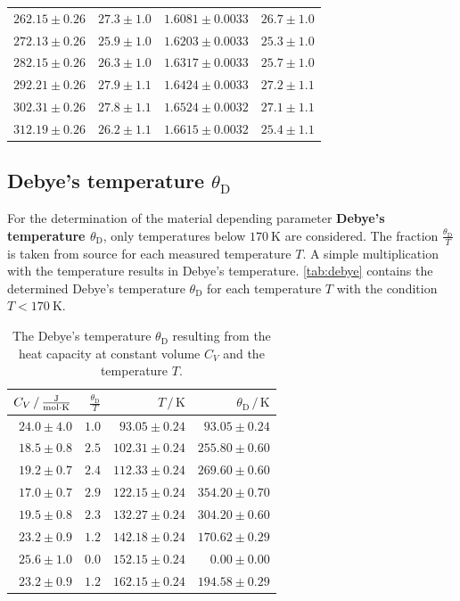 \begin{table}
\begin{tabular}{r r r r}
        $262.15\pm0.26$ & $27.3\pm1.0$ & $1.6081\pm0.0033$ & $26.7\pm1.0$ \\
        $272.13\pm0.26$ & $25.9\pm1.0$ & $1.6203\pm0.0033$ & $25.3\pm1.0$ \\
        $282.15\pm0.26$ & $26.3\pm1.0$ & $1.6317\pm0.0033$ & $25.7\pm1.0$ \\
        $292.21\pm0.26$ & $27.9\pm1.1$ & $1.6424\pm0.0033$ & $27.2\pm1.1$ \\
        $302.31\pm0.26$ & $27.8\pm1.1$ & $1.6524\pm0.0032$ & $27.1\pm1.1$ \\
        $312.19\pm0.26$ & $26.2\pm1.1$ & $1.6615\pm0.0032$ & $25.4\pm1.1$ \\
        \bottomrule
    \end{tabular}
\end{table}
\FloatBarrier

\subsection{Debye's temperature \texorpdfstring{$\theta_\text{D}$}{theta}}
For the determination of the material depending parameter \textbf{Debye's temperature $\theta_\text{D}$}, only temperatures below $\qty{170}{\kelvin}$ are considered.
The fraction $\frac{\theta_\text{D}}{T}$ is taken from source \cite{V47} for each measured temperature $T$.
A simple multiplication with the temperature results in Debye's temperature.
\autoref{tab:debye} contains the determined Debye's temperature $\theta_\text{D}$ for each temperature $T$ with the condition $T < \qty{170}{\kelvin}$. 
\begin{table}
    \centering
    \caption{The Debye's temperature $\theta_\text{D}$ resulting from the heat capacity at constant volume $C_V$ and the temperature $T$.}
    \label{tab:debye}
    \begin{tabular}{r r r r}
        \toprule
        $C_V \,/\, \unit{\frac{\joule}{\mol \cdot \kelvin}}$ & $\frac{\theta_\text{D}}{T}$ & $T \,/\, \unit{\kelvin}$ & $\theta_\text{D} \,/\, \unit{\kelvin}$ \\
        \midrule
        $24.0\pm4.0$ & $1.0$ & $93.05\pm0.24$ & $93.05\pm0.24$ \\
        $18.5\pm0.8$ & $2.5$ & $102.31\pm0.24$ & $255.80\pm0.60$ \\
        $19.2\pm0.7$ & $2.4$ & $112.33\pm0.24$ & $269.60\pm0.60$ \\
        $17.0\pm0.7$ & $2.9$ & $122.15\pm0.24$ & $354.20\pm0.70$ \\
        $19.5\pm0.8$ & $2.3$ & $132.27\pm0.24$ & $304.20\pm0.60$ \\
        $23.2\pm0.9$ & $1.2$ & $142.18\pm0.24$ & $170.62\pm0.29$ \\
        $25.6\pm1.0$ & $0.0$ & $152.15\pm0.24$ & $0.00\pm0.00$ \\
        $23.2\pm0.9$ & $1.2$ & $162.15\pm0.24$ & $194.58\pm0.29$ \\
        \bottomrule
    \end{tabular}
\end{table}

